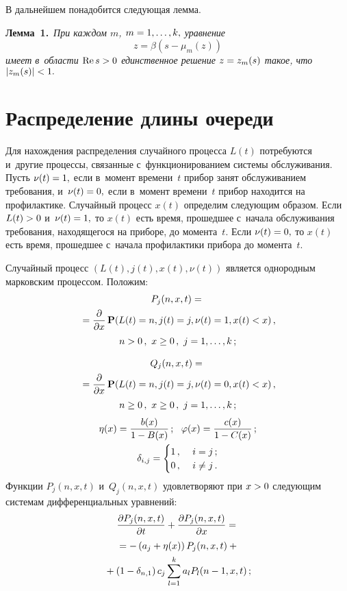 \begin{multicols}{2}
В дальнейшем  понадобится следующая лемма.

\smallskip

\noindent
\textbf{Лемма~1.}\
\textit{При каждом $m$, $m\hm=1,\ldots,k,$ уравнение
$$
z=\beta\left(s-\mu_m(z)\right)
$$
имеет в~области $\mathrm{Re}\, s\hm>0$ единственное решение $z\hm=z_m(s)$ такое, что} 
$|z_m(s)|\hm<1.$


\section{Распределение длины очереди}

Для нахождения распределения случайного процесса $L(t)$  потребуются 
и~другие процессы, связанные с~функционированием системы обслуживания.
Пусть $\nu(t)\hm=1,$ если в~момент времени~$t$ прибор занят обслуживанием требования, 
и~$\nu(t)\hm=0,$ если в~момент времени~$t$ прибор находится на профилактике.
Случайный процесс $x(t)$ определим следующим образом. Если $L(t)\hm>0$ 
и~$\nu(t)\hm=1,$ то $x(t)$ есть время, прошедшее с~начала обслуживания 
требования, находящегося на приборе, до момента~$t.$  Если $\nu(t)\hm=0,$ то $x(t)$ 
есть время, прошедшее с~начала профилактики прибора до момента~$t.$

Случайный процесс $(L(t),j(t),x(t),\nu(t))$ является однородным 
марковским процессом. Положим:
\begin{multline*}
P_j(n,x,t)={}\\
{}=\displaystyle\frac{\displaystyle \partial\mathstrut}{\displaystyle \partial x\mathstrut}\,\mathbf P(L(t)=n,j(t)=j,\nu(t)=1,x(t)<x)\,,\\ 
n>0\,,\ x\ge 0\,,\ j=1,\ldots,k\,;
\end{multline*}

\vspace*{-12pt}

\noindent
\begin{multline*}
Q_j(n,x,t)={}\\
{}=\displaystyle\frac{\displaystyle \partial\mathstrut}{\displaystyle \partial x\mathstrut}\,\mathbf P(L(t)=n,j(t)=j,\nu(t)=0,x(t)<x)\,,\\ 
n\ge 0\,,\ x\ge 0\,,\ j=1,\ldots,k\,;
\end{multline*}
\begin{gather*}
\eta(x)=\displaystyle\frac{\displaystyle b(x)\mathstrut}{\displaystyle 1-B(x)\mathstrut}\,;\ \ \varphi(x)=\displaystyle\frac{\displaystyle c(x)\mathstrut}{\displaystyle 1-C(x)\mathstrut}\,;\\ 
\delta_{i,j}=\begin{cases}
1\,, &\ i=j\,;\\ 
0\,, &\ i\ne j\,.
\end{cases}
\end{gather*}
Функции $P_j(n,x,t)$ и~$Q_j(n,x,t)$ удовлетворяют при $x\hm>0$ следующим системам 
дифференциальных уравнений:
\begin{multline}
\label{3-u}
\displaystyle\frac{\displaystyle \partial P_j(n,x,t)\mathstrut}{\displaystyle \partial t\mathstrut}+
\displaystyle\frac{\displaystyle \partial P_j(n,x,t)\mathstrut}{\displaystyle \partial x\mathstrut}={}\\
{}=
-\left(a_j+\eta(x)\right)
P_j(n,x,t)+{}\\
{}+\left(1-\delta_{n,1}\right)c_j\sum\limits_{l=1}^ka_lP_l(n-1,x,t)\,;
\end{multline}


\end{multicols}
